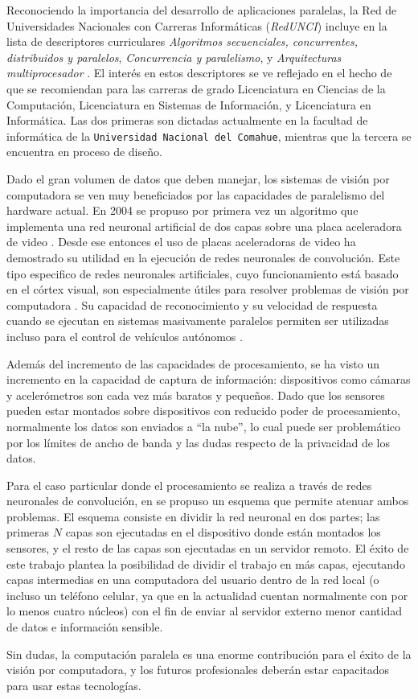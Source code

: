 Reconociendo la importancia del desarrollo de aplicaciones paralelas, la Red
de Universidades Nacionales con Carreras Informáticas (\emph{RedUNCI}) incluye
en la lista de descriptores curriculares \emph{Algoritmos secuenciales,
concurrentes, distribuidos y paralelos}, \emph{Concurrencia y paralelismo}, y
\emph{Arquitecturas multiprocesador} \cite{RedUNCI2015}. El interés en estos
descriptores se ve reflejado en el hecho de que se recomiendan para las
carreras de grado Licenciatura en Ciencias de la Computación, Licenciatura en
Sistemas de Información, y Licenciatura en Informática. Las dos primeras son
dictadas actualmente en la facultad de informática de la \texttt{Universidad
Nacional del Comahue}, mientras que la tercera se encuentra en proceso de
diseño.

Dado el gran volumen de datos que deben manejar, los sistemas de visión por
computadora se ven muy beneficiados por las capacidades de paralelismo del
hardware actual. En 2004 se propuso por primera vez un algoritmo que implementa
una red neuronal artificial de dos capas sobre una placa aceleradora de video
\cite{GPUforMLA}. Desde ese entonces el uso de placas aceleradoras de video ha
demostrado su utilidad en la ejecución de redes neuronales de convolución. Este
tipo especifico de redes neuronales artificiales, cuyo funcionamiento está
basado en el córtex visual, son especialmente útiles para resolver problemas de
visión por computadora \cite{usingCCN4IR2015}. Su capacidad de reconocimiento y
su velocidad de respuesta cuando se ejecutan en sistemas masivamente paralelos
permiten ser utilizadas incluso para el control de vehículos autónomos
\cite{e2eLearning4SDC}.

Además del incremento de las capacidades de procesamiento, se ha visto un
incremento en la capacidad de captura de información: dispositivos como cámaras
y acelerómetros son cada vez más baratos y pequeños. Dado que los sensores
pueden estar montados sobre dispositivos con reducido poder de procesamiento,
normalmente los datos son enviados a ``la nube'', lo cual puede ser problemático
por los límites de ancho de banda y las dudas respecto de la privacidad de los
datos.

Para el caso particular donde el procesamiento se realiza a través de redes
neuronales de convolución, en \cite{pipelinebasedCaffe2017} se propuso un
esquema que permite atenuar ambos problemas. El esquema consiste en dividir la
red neuronal en dos partes; las primeras $N$ capas son ejecutadas en el
dispositivo donde están montados los sensores, y el resto de las capas son
ejecutadas en un servidor remoto. El éxito de este trabajo plantea la
posibilidad de dividir el trabajo en más capas, ejecutando capas intermedias en
una computadora del usuario dentro de la red local (o incluso un teléfono
celular, ya que en la actualidad cuentan normalmente con por lo menos cuatro
núcleos) con el fin de enviar al servidor externo menor cantidad de datos e
información sensible.

Sin dudas, la computación paralela es una enorme contribución para el éxito de
la visión por computadora, y los futuros profesionales deberán estar capacitados
para usar estas tecnologías.
